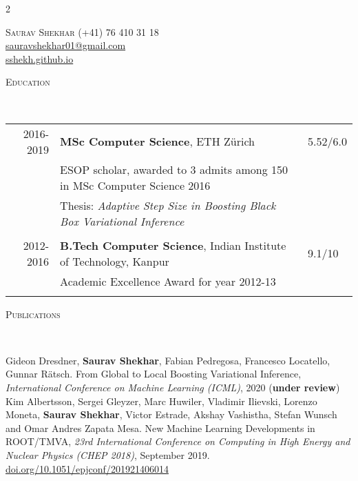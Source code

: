 \documentclass[9pt]{article}
\renewcommand{\arraystretch}{1.5}
\newenvironment{changemargin}[2]{%
  \begin{list}{}{%
      \setlength{\topsep}{0pt}%
    \setlength{\leftmargin}{#1}%
    \setlength{\rightmargin}{#2}%
    \setlength{\listparindent}{\parindent}%
  \setlength{\itemindent}{\parindent}%
    \setlength{\parsep}{\parskip}%
    }%
  \item[]}{\end{list}
    }
\newcommand{\lineover}{
  \begin{changemargin}{-0.05in}{-0.10in}
    \vspace*{-9pt}
    \hrulefill \\
    \vspace*{-2pt}
  \end{changemargin}
}
\newcommand{\header}[1]{
  \begin{changemargin}{-0.5in}{-0.5in}
    \scshape{#1}\\
        \lineover
  \end{changemargin}
}
\newcommand{\name}[1]{
  {\LARGE \scshape {#1}}
}
\newcommand{\contact}[4]{
  \begin{changemargin}{-0.65in}{-0.65in}
    \begin{multicols}{2}
      \name{{#1}}\vfill\null %
                        \columnbreak
                        {#2}\\	
                        {#3}\\ 
                        {#4}\\ 
    \end{multicols}
  \end{changemargin}
}
\begin{document}
\contact{Saurav Shekhar}
{{\hspace{172pt}}\faMobile (+41) 76 410 31 18}
{{\hspace{121pt}} \faEnvelope \href{mailto:sauravshekhar01@gmail.com}{sauravshekhar01@gmail.com}}
{{\hspace{177pt}} \faGithub \href{https://sshekh.github.io/}{sshekh.github.io}}  

\header{Education}
\vspace{4pt}
  \renewcommand{\arraystretch}{1}
  \begin{tabular}{rll}
    2016-2019 & \textbf{MSc Computer Science},  ETH Z{\"u}rich  & 5.52/6.0 \\
            & ESOP scholar, awarded to 3 admits among 150 in MSc Computer Science 2016 &\\
            & Thesis: \emph{Adaptive Step Size in Boosting Black Box Variational Inference} &\\\\
    2012-2016 & \textbf{B.Tech Computer Science},  Indian Institute of Technology, Kanpur & 9.1/10 \\ 
            &  Academic Excellence Award for year 2012-13 & \\\\
  \end{tabular}

\header{Publications}
Gideon Dresdner, {\bf Saurav Shekhar},  Fabian Pedregosa, Francesco Locatello,  Gunnar Rätsch. From Global to Local Boosting Variational Inference, \textit{International Conference on Machine Learning (ICML)}, 2020 ({\bf under review}) \\

\vspace{2mm}
Kim Albertsson, Sergei Gleyzer, Marc Huwiler, Vladimir Ilievski, Lorenzo Moneta, {\bf Saurav Shekhar}, Victor Estrade, Akshay Vashistha, Stefan Wunsch and Omar Andres Zapata Mesa. New Machine Learning Developments in ROOT/TMVA, \textit{23rd International Conference on Computing in High Energy and Nuclear Physics (CHEP 2018)}, September 2019.
\href{https://doi.org/10.1051/epjconf/201921406014}{doi.org/10.1051/epjconf/201921406014}
\end{document}
